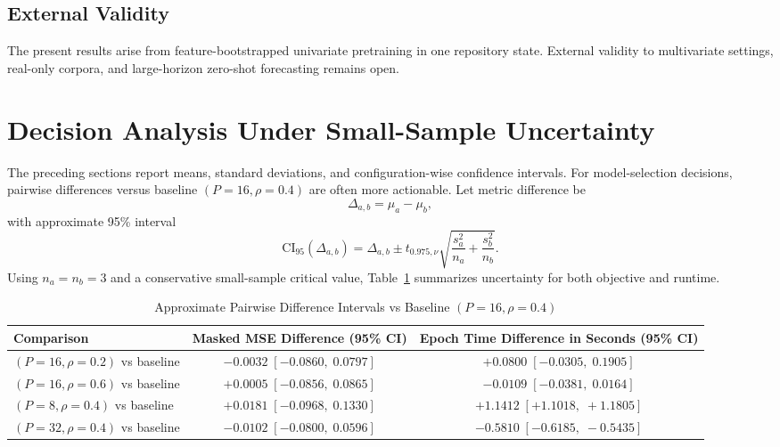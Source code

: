 \documentclass[conference]{IEEEtran}
\begin{document}
\subsection{External Validity}
The present results arise from feature-bootstrapped univariate pretraining in one repository state. External validity to multivariate settings, real-only corpora, and large-horizon zero-shot forecasting remains open.

\section{Decision Analysis Under Small-Sample Uncertainty}
The preceding sections report means, standard deviations, and configuration-wise confidence intervals. For model-selection decisions, pairwise differences versus baseline $(P=16,\rho=0.4)$ are often more actionable. Let metric difference be
\begin{equation}
\Delta_{a,b} = \mu_a - \mu_b,
\end{equation}
with approximate 95\% interval
\begin{equation}
\mathrm{CI}_{95}(\Delta_{a,b}) = \Delta_{a,b} \pm t_{0.975,\nu}\sqrt{\frac{s_a^2}{n_a}+\frac{s_b^2}{n_b}}.
\label{eq:pairwise_ci}
\end{equation}
Using $n_a=n_b=3$ and a conservative small-sample critical value, Table~\ref{tab:pairwise_ci} summarizes uncertainty for both objective and runtime.

\begin{table}[t]
\caption{Approximate Pairwise Difference Intervals vs Baseline $(P=16,\rho=0.4)$}
\label{tab:pairwise_ci}
\centering
\scriptsize
\begin{tabular}{lcc}
\toprule
Comparison & Masked MSE Difference (95\% CI) & Epoch Time Difference in Seconds (95\% CI) \\
\midrule
$(P=16,\rho=0.2)$ vs baseline & $-0.0032\;[-0.0860,\;0.0797]$ & $+0.0800\;[-0.0305,\;0.1905]$ \\
$(P=16,\rho=0.6)$ vs baseline & $+0.0005\;[-0.0856,\;0.0865]$ & $-0.0109\;[-0.0381,\;0.0164]$ \\
$(P=8,\rho=0.4)$ vs baseline  & $+0.0181\;[-0.0968,\;0.1330]$ & $+1.1412\;[+1.1018,\;+1.1805]$ \\
$(P=32,\rho=0.4)$ vs baseline & $-0.0102\;[-0.0800,\;0.0596]$ & $-0.5810\;[-0.6185,\;-0.5435]$ \\
\bottomrule
\end{tabular}
\end{table}
\end{document}
